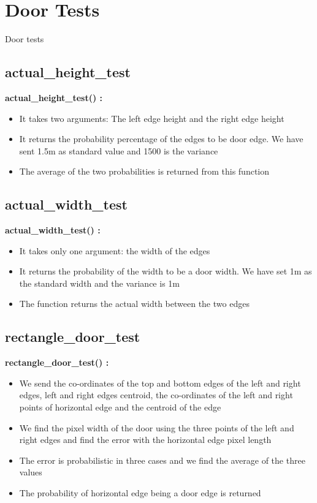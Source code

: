 \documentclass[10pt, a4paper]{beamer}
\begin{document}
\section{Door Tests}
\begin{frame}[allowframebreaks]{Door tests}
  \subsection{actual\_height\_test}
    \textbf{actual\_height\_test() : }
      \begin{itemize}
	\item It takes two arguments: The left edge height and the right edge height
	\item It returns the probability percentage of the edges to be door edge. We have sent 1.5m as standard value and 1500 is the variance
	\item The average of the two probabilities is returned from this function
      \end{itemize}
\framebreak
  \subsection{actual\_width\_test}
    \textbf{actual\_width\_test() : }
      \begin{itemize}
       \item It takes only one argument: the width of the edges
       \item It returns the probability of the width to be a door width. We have set 1m as the standard width and the variance is 1m
       \item The function returns the actual width between the two edges
      \end{itemize}
\framebreak
  \subsection{rectangle\_door\_test}
    \textbf{rectangle\_door\_test() : }
      \begin{itemize}
       \item We send the co-ordinates of the top and bottom edges of the left and right edges, left and right edges centroid, the co-ordinates of the left and right points of horizontal edge and the centroid of the edge
       \item We find the pixel width of the door using the three points of the left and right edges and find the error with the horizontal edge pixel length
       \item The error is probabilistic in three cases and we find the average of the three values
       \item The probability of horizontal edge being a door edge is returned
      \end{itemize}
\framebreak

\end{frame}
\end{document}
